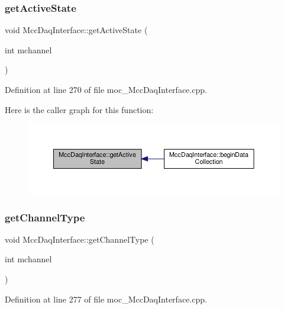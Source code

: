 \subsubsection{\texorpdfstring{get\+Active\+State}{getActiveState}}
{\footnotesize\ttfamily void Mcc\+Daq\+Interface\+::get\+Active\+State (\begin{DoxyParamCaption}\item[{int}]{mchannel }\end{DoxyParamCaption})\hspace{0.3cm}{\ttfamily [signal]}}



Definition at line 270 of file moc\+\_\+\+Mcc\+Daq\+Interface.\+cpp.

Here is the caller graph for this function\+:
\nopagebreak
\begin{figure}[H]
\begin{center}
\leavevmode
\includegraphics[width=350pt]{class_mcc_daq_interface_ac2e329b0d2d52885d1fe96c64df3331a_icgraph}
\end{center}
\end{figure}
\mbox{\label{class_mcc_daq_interface_a42ca742cf207cb615c5b7f9a172dcb8b}} 
\subsubsection{\texorpdfstring{get\+Channel\+Type}{getChannelType}}
{\footnotesize\ttfamily void Mcc\+Daq\+Interface\+::get\+Channel\+Type (\begin{DoxyParamCaption}\item[{int}]{mchannel }\end{DoxyParamCaption})\hspace{0.3cm}{\ttfamily [signal]}}



Definition at line 277 of file moc\+\_\+\+Mcc\+Daq\+Interface.\+cpp.

